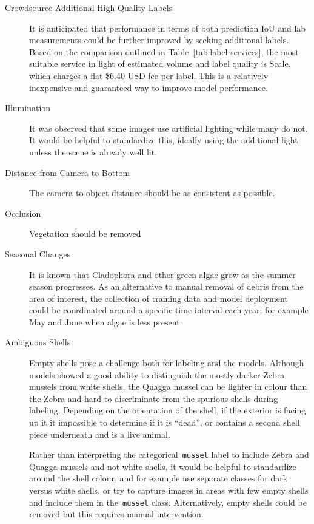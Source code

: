 \documentclass[11pt]{article} %
\begin{document}
\begin{description}
	
	\item[Crowdsource Additional High Quality Labels] It is anticipated that 
	performance in terms of both prediction IoU and lab measurements could be 
	further improved by seeking additional labels. Based on the comparison
	outlined in Table~\ref{tab:label-services}, the most suitable service in 
	light of estimated volume and label quality is Scale, which charges a flat 
	\$6.40 USD fee per label. This is a relatively inexpensive and guaranteed
	way to improve model performance.
	
	\item[Illumination]	It was observed that some images use artificial 
	lighting while many do not. It would be helpful to standardize this, 
	ideally using the additional light unless the scene is already well lit.
	
	\item[Distance from Camera to Bottom] The camera to object distance should 
	be as consistent as possible.
	
	\item[Occlusion] Vegetation should be removed
	
	\item[Seasonal Changes] It is known that Cladophora and other green algae 
	grow as the summer season progresses. As an alternative to manual removal 
	of debris from the area of interest, the collection of training data and 
	model deployment could be coordinated around a specific time interval each 
	year, for example May and June when algae is less present.
	
	\item[Ambiguous Shells] Empty shells pose a challenge both for labeling and 
	the models. Although models showed a good ability to distinguish the mostly
	darker Zebra mussels from white shells, the Quagga mussel can be lighter in 
	colour than the Zebra and hard to discriminate from the spurious shells 
	during labeling. Depending on the orientation of the shell, if the exterior
	is facing up it it impossible to determine if it is ``dead'', or contains a
	second shell piece underneath and is a live animal. 
	
	Rather than interpreting the categorical~\texttt{mussel} label to include
	Zebra and Quagga mussels and not white shells, it would be helpful to 
	standardize around the shell colour, and for example use separate classes 
	for dark versus white shells, or try to capture images in areas with few 
	empty shells and include them in the~\texttt{mussel} class. 
	Alternatively, empty shells could be removed but this requires manual 
	intervention.
	
\end{description}
\end{document}
